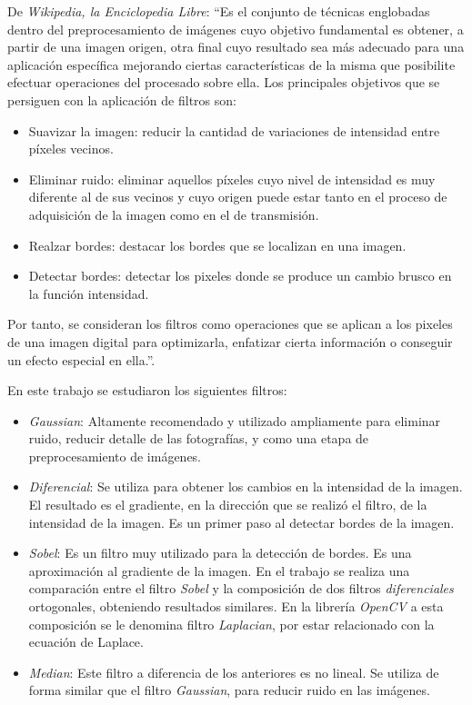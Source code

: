 \documentclass[10pt,a4paper]{article}
\begin{document}
De \textit{Wikipedia, la Enciclopedia Libre}: ``Es el conjunto de técnicas englobadas dentro del preprocesamiento de imágenes cuyo objetivo fundamental es obtener, a partir de una imagen origen, otra final cuyo resultado sea más adecuado para una aplicación específica mejorando ciertas características de la misma que posibilite efectuar operaciones del procesado sobre ella. Los principales objetivos que se persiguen con la aplicación de filtros son:
\begin{itemize}
\item Suavizar la imagen: reducir la cantidad de variaciones de intensidad entre píxeles vecinos.
\item Eliminar ruido: eliminar aquellos píxeles cuyo nivel de intensidad es muy diferente al de sus vecinos y cuyo origen puede estar tanto en el proceso de adquisición de la imagen como en el de transmisión.
\item Realzar bordes: destacar los bordes que se localizan en una imagen.
\item Detectar bordes: detectar los pixeles donde se produce un cambio brusco en la función intensidad.
\end{itemize}

Por tanto, se consideran los filtros como operaciones que se aplican a los pixeles de una imagen digital para optimizarla, enfatizar cierta información o conseguir un efecto especial en ella.''.

En este trabajo se estudiaron los siguientes filtros:
\begin{itemize}
\item \textit{Gaussian}: Altamente recomendado y utilizado ampliamente para eliminar ruido, reducir detalle de las fotografías, y como una etapa de preprocesamiento de imágenes.
\item \textit{Diferencial}: Se utiliza para obtener los cambios en la intensidad de la imagen. El resultado es el gradiente, en la dirección que se realizó el filtro, de la intensidad de la imagen. Es un primer paso al detectar bordes de la imagen.
\item \textit{Sobel}: Es un filtro muy utilizado para la detección de bordes. Es una aproximación al gradiente de la imagen. En el trabajo se realiza una comparación entre el filtro \textit{Sobel} y la composición de dos filtros \textit{diferenciales} ortogonales, obteniendo resultados similares. En la librería \textit{OpenCV} a esta composición se le denomina filtro \textit{Laplacian}, por estar relacionado con la ecuación de Laplace.
\item \textit{Median}: Este filtro a diferencia de los anteriores es no lineal. Se utiliza de forma similar que el filtro \textit{Gaussian}, para reducir ruido en las imágenes.
\end{itemize}
\end{document}
